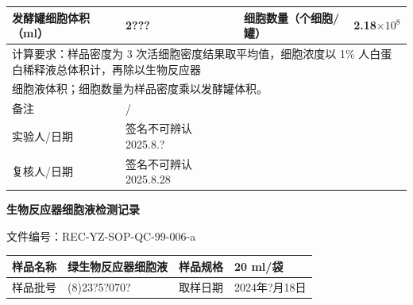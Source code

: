 \documentclass[UTF8,10pt,a4paper,fontset=fandol]{ctexart}
\newcommand{\fieldvalue}[1]{#1}
\newcommand{\handwritten}[1]{#1}
\begin{document}
\noindent
\begin{tabularx}{\textwidth}{|l|X|l|X|}
\hline
发酵罐细胞体积（ml） &
\fieldvalue{\handwritten{2???}} &
细胞数量（个细胞/罐） &
\fieldvalue{\handwritten{2.18$\times10^{8}$}}\\
\hline
\multicolumn{4}{|l|}{计算要求：样品密度为 3 次活细胞密度结果取平均值，细胞浓度以 1\% 人白蛋白稀释液总体积计，再除以生物反应器}\\
\multicolumn{4}{|l|}{细胞液体积；细胞数量为样品密度乘以发酵罐体积。}\\
\hline
备注 &
\fieldvalue{\handwritten{/}} &
&\\
\hline
实验人/日期 &
\fieldvalue{\handwritten{签名不可辨认}}%
\fieldvalue{\handwritten{2025.8.?}} &
&\\
\hline
复核人/日期 &
\fieldvalue{\handwritten{签名不可辨认}}%
\fieldvalue{\handwritten{2025.8.28}} &
&\\
\hline
\end{tabularx}


\newpage

\begin{center}
\textbf{生物反应器细胞液检测记录}
\end{center}

文件编号：\fieldvalue{REC-YZ-SOP-QC-99-006-a}

\begin{tabularx}{\textwidth}{|l|X|l|X|}
\hline
样品名称 &
\fieldvalue{绿生物反应器细胞液} &
样品规格 &
\fieldvalue{\handwritten{20}} ml/袋
\\ \hline
样品批号 &
\fieldvalue{\handwritten{(8)23?5?070?}} &
取样日期 &
\fieldvalue{\handwritten{2024年?月18日}}
\\ \hline
\end{tabularx}
\end{document}
